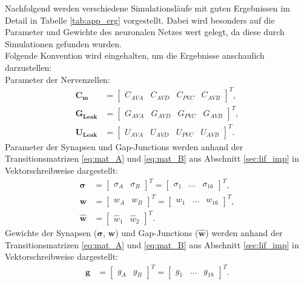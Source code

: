 	Nachfolgend werden verschiedene Simulationsläufe mit guten Ergebnissen im Detail in Tabelle \ref{tab:app_erg} vorgestellt. Dabei wird besonders auf die Parameter und Gewichte des neuronalen Netzes wert gelegt, da diese durch Simulationen gefunden wurden.\\
	Folgende Konvention wird eingehalten, um die Ergebnisse anschaulich darzustellen:\\
	Parameter der Nervenzellen:
	\begin{align}
		\boldsymbol{C_m} &= \begin{bmatrix}C_{AVA} & C_{AVD} & C_{PVC} & C_{AVB}\end{bmatrix}^T,\\
		\boldsymbol{G_{Leak}} &= \begin{bmatrix}G_{AVA} & G_{AVD} & G_{PVC} & G_{AVB}\end{bmatrix}^T,\\
		\boldsymbol{U_{Leak}} &= \begin{bmatrix}U_{AVA} & U_{AVD} & U_{PVC} & U_{AVB}\end{bmatrix}^T.
	\end{align}
	Parameter der Synapsen und Gap-Junctions  werden anhand der Transitionsmatrizen \eqref{eq:mat_A} und \eqref{eq:mat_B} aus Abschnitt \ref{sec:lif_imp} in Vektorschreibweise dargestellt:
	\begin{align}
		\boldsymbol{\sigma} &= \begin{bmatrix}\sigma_A & \sigma_B\end{bmatrix}^T = \begin{bmatrix}\sigma_1 & \dots & \sigma_{16}\end{bmatrix}^T,\\
		\boldsymbol{w} &= \begin{bmatrix}w_A & w_B\end{bmatrix}^T = \begin{bmatrix}w_1 & \dots & w_{16}\end{bmatrix}^T,\\
		\boldsymbol{\hat{w}} &= \begin{bmatrix}\hat{w}_1 & \hat{w}_{2}\end{bmatrix}^T.
	\end{align}
	Gewichte der Synapsen ($\boldsymbol{\sigma}$, $\boldsymbol{w}$) und Gap-Junctions ($\boldsymbol{\hat{w}}$) werden anhand der Transitionsmatrizen \eqref{eq:mat_A} und \eqref{eq:mat_B} aus Abschnitt \ref{sec:lif_imp} in Vektorschreibweise dargestellt:
	\begin{align}
		\boldsymbol{g} &= \begin{bmatrix}g_A & g_B\end{bmatrix}^T = \begin{bmatrix}g_1 & \dots & g_{18}\end{bmatrix}^T.
	\end{align}
